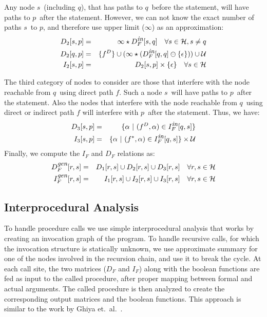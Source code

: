 \documentclass[letterpaper]{sig-alternate}
\newcommand{\p}{\ensuremath{p}}
\newcommand{\q}{\ensuremath{q}}
\newcommand{\s}{\ensuremath{s}}
\newcommand{\myr}{\ensuremath{r}}
\newcommand{\drct}{\ensuremath{D}}
\newcommand{\heap}{\ensuremath{\mathcal{H}}}
\newcommand{\upath}{\ensuremath{\mathcal{U}}}
\newcommand{\epsilonset}{\ensuremath{\{\epsilon\}}}
\newcommand{\din}{\mbox{\footnotesize\em in}}
\newcommand{\dgen}{\mbox{\footnotesize\em gen}}
\newcommand{\remOne}[2]{\ensuremath{#1 \ominus #2}}
\begin{document}
\begin{enumerate}
Any node \s\ (including \q), that has paths to \q\ before the
statement, will have paths to \p\ after the
statement. However, we can not know the exact number of paths
\s\ to \p, and therefore use upper limit ($\infty$) as an
approximation:
\begin{eqnarray*}
  D_2[\s, \p] &=& \infty \star D_F^{\din}[\s, \q] \quad
  \forall \s \in \heap, \s \not=\q \\
  {D_2[\q,\p]} &=& \{ f^{\drct}\} \cup (\infty \star (\remOne{D_F^{\din}[\q, \q]}{\epsilonset})) \cup \upath  \\ 
  I_2[\s, \p] &=& D_2[\s, \p] \times
  \epsilonset \quad \forall \s \in \heap 
\end{eqnarray*}

The third category of nodes to consider are those that
interfere with the node reachable from \q\ using direct path
$f$. Such a node \s\ will have paths to \p\ after the
statement. Also the nodes that interfere with the node reachable from \q\ using direct or indirect path
$f$ will interfere with \p\ after the statement. Thus, we have:
\begin{eqnarray*}
  D_3[\s, \p] &=& \{ \alpha \ \vert \ (f^{\drct}, \alpha) \in I_F^{\din}[\q, \s] \}  \\
  I_3[\s, \p] &=& \{\alpha \ \vert\ (f^\anysup, \alpha) \in I_F^{\din}[\q, \s]\} \times \upath 
\end{eqnarray*}
Finally, we compute the $I_F$ and $D_F$ relations as:
\begin{eqnarray*}
D_F^{\dgen}[\myr, \s] &= & D_1[\myr, \s] \cup D_2[\myr, \s] \cup D_3[\myr, \s] \quad \forall\myr,\s \in \heap  \\
I_F^{\dgen}[\myr, \s] &= & I_1[\myr, \s] \cup I_2[\myr, \s] \cup I_3[\myr, \s] \quad \forall\myr,\s \in \heap 
\end{eqnarray*}
\end{enumerate}

\subsection{Interprocedural Analysis}
\label{Interprocedural_Analysis}
To handle procedure calls we use simple interprocedural
analysis that works by creating an invocation graph of the
program. To handle recursive calls, for which the invocation
structure is statically unknown, we use approximate summary
for one of the nodes involved in the recursion chain, and use
it to break the cycle. At each call site, the two matrices
($D_F$ and $I_F$) along with the boolean functions are fed as
input to the called procedure, after proper mapping between
formal and actual arguments. The called procedure is then
analyzed to create the corresponding output matrices and the
boolean functions. This approach is similar to the work by
Ghiya et.~al.~\cite{Ghiya96}.
\end{document}
